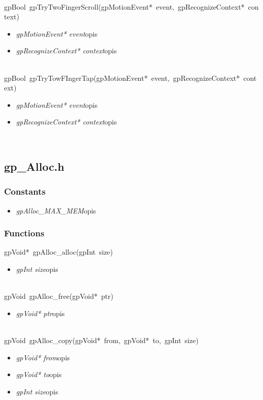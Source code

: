  \ \\
\mbox{\textsf{gpBool gpTryTwoFingerScroll(gpMotionEvent* event, gpRecognizeContext* context)}}
	\begin{itemize}
		\item \textit{gpMotionEvent* event}\quad opis
		\item \textit{gpRecognizeContext* context}\quad opis
	\end{itemize}

 \ \\
\mbox{\textsf{gpBool gpTryTowFIngerTap(gpMotionEvent* event, gpRecognizeContext* context)}}
	\begin{itemize}
		\item \textit{gpMotionEvent* event}\quad opis
		\item \textit{gpRecognizeContext* context}\quad opis
	\end{itemize}

 \ \\

\subsection{gp_Alloc.h}
\subsubsection{Constants}
\begin{itemize}
\item \textit{gpAlloc_MAX_MEM}\qquad opis
\end{itemize}
\subsubsection{Functions}
\mbox{\textsf{gpVoid* gpAlloc_alloc(gpInt size)}}
	\begin{itemize}
		\item \textit{gpInt size}\quad opis
	\end{itemize}

 \ \\
\mbox{\textsf{gpVoid gpAlloc_free(gpVoid* ptr)}}
	\begin{itemize}
		\item \textit{gpVoid* ptr}\quad opis
	\end{itemize}

 \ \\
\mbox{\textsf{gpVoid gpAlloc_copy(gpVoid* from, gpVoid* to, gpInt size)}}
	\begin{itemize}
		\item \textit{gpVoid* from}\quad opis
		\item \textit{gpVoid* to}\quad opis
		\item \textit{gpInt size}\quad opis
	\end{itemize}

